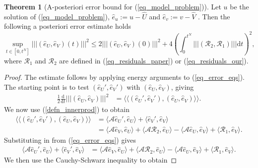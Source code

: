 \documentclass[12pt,a4paper]{article}
\numberwithin{equation}{section}
\theoremstyle{definition}
\newcommand{\pnorm}[1]{\left|\left|\left|#1\right|\right|\right|}
\newcommand{\innerprod}[1]{\langle\langle#1\rangle\rangle}
\newcommand{\innerprodsingle}[1]{\langle#1\rangle}
\newcommand{\qp}[1]{\left(#1\right)}
\newcommand{\qb}[1]{\left[#1\right]}
\newcommand{\rec}[1]{\widehat{{#1}}}
\newtheorem{Thm}[subsection]{Theorem}
\begin{document}
\begin{Thm}[A-posteriori error bound for (\ref{eq_model_problem})]
Let $u$ be the solution of (\ref{eq_model_problem}), $\hat{e}_u:=u-\rec{U}$ and $\hat{e}_v:=v-\rec{V}$ .  Then the following a posteriori error estimate holds
\begin{equation}\label{eq_bound}
\sup_{t\in\qb{0,t^N}}\pnorm{\qp{\hat{e}_U,\hat{e}_V}\qp{t}}^2\leq
2\pnorm{\qp{\hat{e}_U,\hat{e}_V}\qp{0}}^2+
4\qp{\int_0^{t^N}\pnorm{\qp{\mathcal{R}_2,\mathcal{R}_1}}\mathrm{d}t}^2,
\end{equation}
where $\mathcal{R}_1$ and $\mathcal{R}_2$ are defined in (\ref{eq_residuals_paper}) or (\ref{eq_residuals_our}).
\end{Thm}
\begin{proof}
The estimate follows by applying energy arguments to (\ref{eq_error_eqs}).  The starting point is to test $\qp{\hat{e}_U', \hat{e}_V'}$ with $\qp{\hat{e}_U, \hat{e}_V}$, giving
\begin{equation}
\begin{aligned}
\frac{1}{2}\frac{\mathrm{d}}{\mathrm{d}t}\pnorm{\qp{\hat{e}_U,\hat{e}_V}}^2
    &=\innerprod{\qp{\hat{e}_U', \hat{e}_V'}, \qp{\hat{e}_U, \hat{e}_V}}.
\end{aligned}
\end{equation}
We now use (\ref{defn_innerprod}) to obtain 
\begin{equation}
\begin{aligned}
\innerprod{\qp{\hat{e}_U', \hat{e}_V'}, \qp{\hat{e}_U, \hat{e}_V}}
&=\innerprodsingle{\mathcal{A}\hat{e}_U',\hat{e}_U}+\innerprodsingle{\hat{e}_V',\hat{e}_V}\\
&=\innerprodsingle{\mathcal{A}\hat{e}_V,\hat{e}_U}
+\innerprodsingle{\mathcal{A}\mathcal{R}_2,\hat{e}_U}
-\innerprodsingle{\mathcal{A}\hat{e}_U,\hat{e}_V}
+\innerprodsingle{\mathcal{R}_1,\hat{e}_V}.
\end{aligned}
\end{equation}
Substituting in from (\ref{eq_error_eqs}) gives 
\begin{equation}
\begin{aligned}
\innerprodsingle{\mathcal{A}\hat{e}_U',\hat{e}_U}+\innerprodsingle{\hat{e}_V',\hat{e}_V}&
=\innerprodsingle{\mathcal{A}\hat{e}_V,\hat{e}_U}
+\innerprodsingle{\mathcal{A}\mathcal{R}_2,\hat{e}_U}
-\innerprodsingle{\mathcal{A}\hat{e}_U,\hat{e}_V}
+\innerprodsingle{\mathcal{R}_1,\hat{e}_V}.
\end{aligned}
\end{equation}
We then use the Cauchy-Schwarz inequality to obtain

\end{proof}
\end{document}
